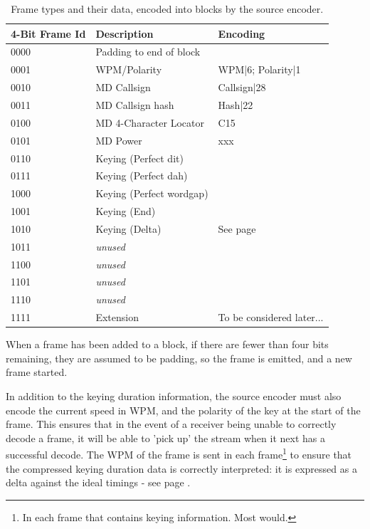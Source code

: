 \documentclass[a4paper]{tufte-handout}
\begin{document}
    \begin{table}[h]

        \selectfont
        \begin{tabular}{lll}
            \toprule
            4-Bit Frame Id & Description & Encoding \\
            \midrule
            0000 & Padding to end of block &  \\
            0001 & WPM/Polarity & WPM|6; Polarity|1 \\ 
            0010 & MD Callsign & Callsign|28 \\
            0011 & MD Callsign hash & Hash|22 \\
            0100 & MD 4-Character Locator & C15 \\
            0101 & MD Power & xxx \\
            0110 & Keying (Perfect dit) & \\
            0111 & Keying (Perfect dah) & \\
            1000 & Keying (Perfect wordgap) & \\
            1001 & Keying (End) & \\
            1010 & Keying (Delta) & See page \pageref{section:delta-encoding} \\
            1011 & \emph{unused} & \\
            1100 & \emph{unused} & \\
            1101 & \emph{unused} & \\
            1110 & \emph{unused} & \\
            1111 & Extension & To be considered later... \\
		\end{tabular}
		\caption{Frame types and their data, encoded into blocks by the source encoder.}
		\label{table:frame-types}
	\end{table}

When a frame has been added to a block, if there are fewer than four bits remaining, they are assumed to be padding, so the frame is emitted, and a new frame started.

In addition to the keying duration information, the source encoder must also encode the current speed in WPM, and the polarity of the key at the start of the frame. This ensures that in the event of a receiver being unable to correctly decode a frame, it will be able to 'pick up' the stream when it next has a successful decode. The WPM of the frame is sent in each frame\footnote{In each frame that contains keying information. Most would.} to ensure that the compressed keying duration data is correctly interpreted: it is expressed as a delta against the ideal timings - see page \pageref{section:delta-encoding}.
\end{document}
